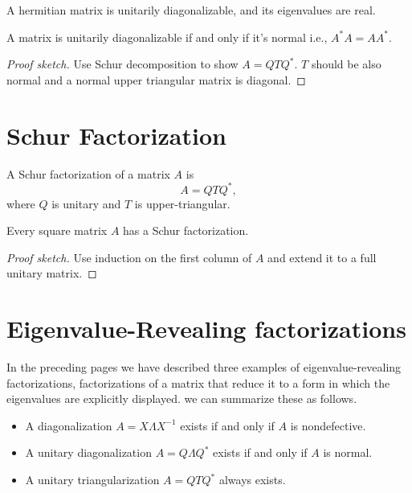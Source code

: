 \begin{theorem}
\label{thm: Hermit eig}
A hermitian matrix is unitarily diagonalizable, and its eigenvalues are real. 
\end{theorem}


\begin{theorem}
\label{thm: norm eig}
A matrix is unitarily diagonalizable if and only if it's normal i.e., $A^*A = AA^*$. 
\end{theorem}
\begin{proof}[Proof sketch]
Use Schur decomposition to show $A= QT Q^*$. $T$ should be also normal and a normal upper triangular matrix is diagonal.  
\end{proof}


\section{Schur Factorization} 

\begin{definition}
\label{def: Schur factorization}
A Schur factorization of a matrix $A$ is 
\[
A = QT Q^*,  
\] 
where $Q$ is unitary and $T$ is upper-triangular. 
\end{definition}


\begin{theorem}
\label{thm: Schur factor}
Every square matrix $A$ has a Schur factorization. 
\end{theorem}
\begin{proof}[Proof sketch]
Use induction on the first column of $A$ and extend it to a full unitary matrix.  
\end{proof}

\section{Eigenvalue-Revealing factorizations} 
In the preceding pages we have described three examples of eigenvalue-revealing factorizations, factorizations of a matrix that reduce it to a form in which the eigenvalues are explicitly displayed. we can summarize these as follows. 
\begin{itemize}
    \item A diagonalization $A = X\Lambda X^{-1} $ exists if and only if $A$ is nondefective. 
    \item A unitary diagonalization $A = Q\Lambda Q^*$ exists if and only if $A$ is normal. 
    \item A unitary triangularization $A = QTQ^*$ always exists.    
\end{itemize}

